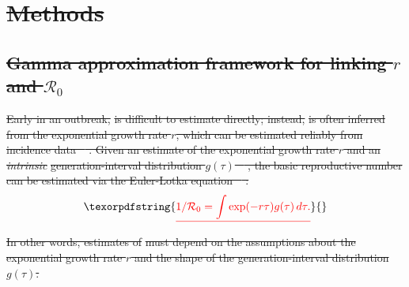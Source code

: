 \documentclass[12pt]{article}
\newcommand{\Ro}{\ensuremath{{\mathcal R}_{0}}\xspace}
\providecommand{\DIFdeltex}[1]{{\protect\color{red}\sout{#1}}}                      %
\providecommand{\DIFdelbegin}{} %
\providecommand{\DIFdel}[1]{\texorpdfstring{\DIFdeltex{#1}}{}} %
\newcommand{\DIFscaledelfig}{0.5}
\newlength{\DIFdelgraphicswidth} %
\newlength{\DIFdelgraphicsheight} %
\newcommand{\DIFdelincludegraphics}[2][]{%
\sbox{\DIFdelgraphicsbox}{\DIFOincludegraphics[#1]{#2}}%
\settoboxwidth{\DIFdelgraphicswidth}{\DIFdelgraphicsbox} %
\settoboxtotalheight{\DIFdelgraphicsheight}{\DIFdelgraphicsbox} %
\scalebox{\DIFscaledelfig}{%
\parbox[b]{\DIFdelgraphicswidth}{\usebox{\DIFdelgraphicsbox}\\[-\baselineskip] \rule{\DIFdelgraphicswidth}{0em}}\llap{\resizebox{\DIFdelgraphicswidth}{\DIFdelgraphicsheight}{%
\setlength{\unitlength}{\DIFdelgraphicswidth}%
\begin{picture}(1,1)%
\thicklines\linethickness{2pt} %
{\color[rgb]{1,0,0}\put(0,0){\framebox(1,1){}}}%
{\color[rgb]{1,0,0}\put(0,0){\line( 1,1){1}}}%
{\color[rgb]{1,0,0}\put(0,1){\line(1,-1){1}}}%
\end{picture}%
}\hspace*{3pt}}} %
} %
\DeclareRobustCommand{\DIFdelbegin}{\DIFOdelbegin \let\includegraphics\DIFdelincludegraphics} %
\begin{document}
\DIFdelbegin \section{\DIFdel{Methods}}
\addtocounter{section}{-1}%

\subsection{\DIFdel{Gamma approximation framework for linking $r$ and $\Ro$}}
\addtocounter{subsection}{-1}%

\DIFdel{Early in an outbreak, }%
\DIFdel{is difficult to estimate directly;
instead, }%
\DIFdel{is often inferred from the exponential growth rate $r$, which can be estimated reliably from incidence data \mbox{%
\citep{mills2004transmissibility, nishiura2009transmission, ma2014estimating}}\hspace{0pt}%
.
Given an estimate of the exponential growth rate $r$ and an }\emph{\DIFdel{intrinsic}} %
\DIFdel{generation-interval distribution $g(\tau)$ \mbox{%
\citep{champredon2015intrinsic}}\hspace{0pt}%
, the basic reproductive
number can be estimated via the Euler-Lotka equation \mbox{%
\citep{wallinga2007generation}}\hspace{0pt}%
:
}%
\begin{displaymath}
\DIFdel{1/\Ro = \int \exp(-r\tau) g(\tau) \, d\tau.
}\end{displaymath}%
\DIFdel{In other words, estimates of }%
\DIFdel{must
depend on the assumptions about the
exponential growth rate $r$ and the shape of the generation-interval distribution $g(\tau)$.
}%
\end{document}
